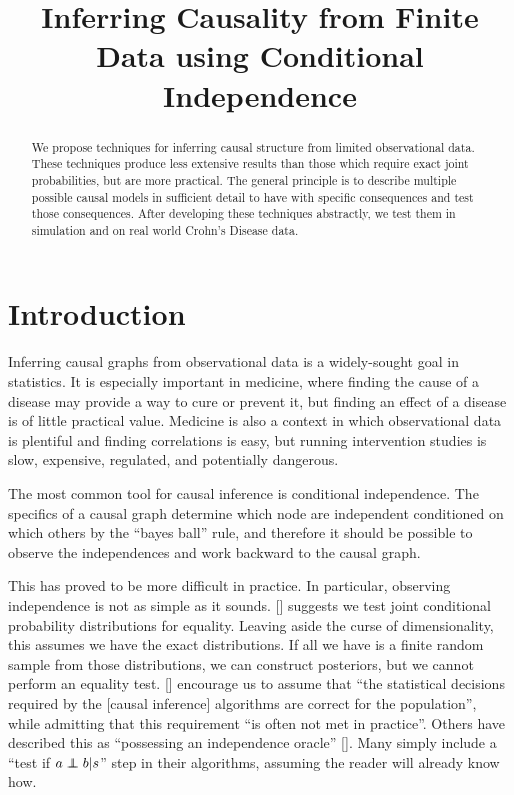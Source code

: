 \documentclass[letterpaper]{article}
\title{Inferring Causality from Finite Data using Conditional Independence}
\author{}
\newcommand\indep{\protect\mathpalette{\protect\independenT}{\perp}}
\def\independenT#1#2{\mathrel{\rlap{$#1#2$}\mkern2mu{#1#2}}}
\begin{document}
\maketitle

\begin{abstract}
  We propose techniques for inferring causal structure from limited
  observational data.  These techniques produce less extensive results
  than those which require exact joint probabilities, but are more
  practical.  The general principle is to describe multiple
  possible causal models in sufficient detail to have with specific
  consequences and test those
  consequences.  After developing these techniques abstractly, we test
  them in simulation and on real world Crohn's Disease data.
\end{abstract}

\section{Introduction}
Inferring causal graphs from observational data is a widely-sought
goal in statistics.  It is especially important in medicine, where
finding the cause of a disease may provide a way to cure or prevent
it, but finding an effect of a disease is of little practical value.
Medicine is also a context in which observational data is plentiful and finding
correlations is easy, but running intervention studies is slow,
expensive, regulated, and potentially dangerous.

The most common tool for causal inference is conditional
independence.  The specifics of a causal graph determine which node
are independent conditioned on which others by the ``bayes ball''
rule, and therefore it should be possible to observe the independences
and work backward to the causal graph.

This has proved to be more difficult in practice.  In particular,
observing independence is not as simple as it sounds.  [\cite{Pearl}] suggests
we test joint conditional probability distributions for equality.
Leaving aside the curse of dimensionality, this assumes we have the
exact distributions.  If all we have is a finite random sample from
those distributions, we can construct posteriors, but we cannot perform
an equality test.  [\cite{Spirtes}] encourage us to assume that
``the statistical decisions required by the [causal inference]
algorithms are correct
for the population'', while admitting that this requirement ``is often not met in
practice''.  Others have described this as ``possessing an
independence oracle'' [\cite{Peters,pcalg}].  Many simply include a
``test if $a\indep b|s$'' step in their algorithms, assuming the
reader will already know how.
\end{document}

